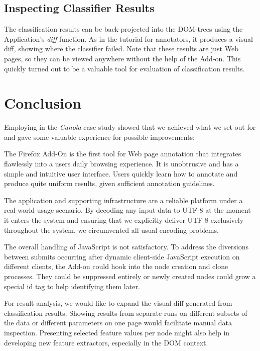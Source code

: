 \subsection{Inspecting Classifier Results}

The classification results can be back-projected into the DOM-trees using the Application's \textit{diff} function.
As in the tutorial for annotators, it produces a visual diff, showing where the classifier failed.
Note that these results are just Web pages, so they can be viewed anywhere without the help of the Add-on.
This quickly turned out to be a valuable tool for evaluation of classification results.

\section{\label{sec:limitations}Conclusion\label{conc}}

Employing {\KrdWrd} in the \textit{Canola} case study showed that we achieved what we set out for and gave some valuable experience for possible improvements:

The {\KrdWrd} Firefox Add-On is the first tool for Web page annotation that integrates flawlessly into a users daily browsing experience.
It is unobtrusive and has a simple and intuitive user interface.
Users quickly learn how to annotate and produce quite uniform results, given sufficient annotation guidelines.

The {\KrdWrd} application and supporting infrastructure are a reliable platform under a real-world usage scenario.
By decoding any input data to UTF-8 at the moment it enters the system and ensuring that we explicitly deliver UTF-8 exclusively throughout the system, we circumvented all usual encoding problems.

The overall handling of JavaScript is not satisfactory.
To address the diversions between submits occurring after dynamic client-side JavaScript execution on different clients, the Add-on could hook into the node creation and clone processes.
They could be suppressed entirely or newly created nodes could grow a special id tag to help identifying them later.

For result analysis, we would like to expand the visual diff generated from classification results.
Showing results from separate runs on different subsets of the data or different parameters on one page would facilitate manual data inspection.
Presenting selected feature values per node might also help in developing new feature extractors, especially in the DOM context.

